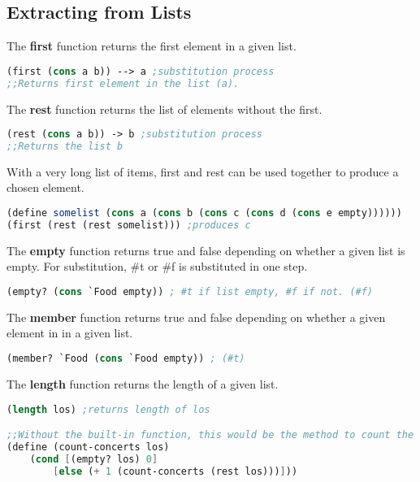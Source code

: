 \documentclass[english, 12pt]{article}
\begin{document}
\subsection{Extracting from Lists}
\begin{defn}
The \textbf{first} function returns the first element in a given list.
\begin{lstlisting}[language=Scheme]
(first (cons a b)) --> a ;substitution process
;;Returns first element in the list (a).
\end{lstlisting}
\end{defn}
\begin{defn}
The \textbf{rest} function returns the list of elements without the first. 
\begin{lstlisting}[language=Scheme]
(rest (cons a b)) -> b ;substitution process
;;Returns the list b 
\end{lstlisting}
\end{defn}
\begin{note}
With a very long list of items, first and rest can be used together to produce a chosen element.
\begin{lstlisting}[language=Scheme]
(define somelist (cons a (cons b (cons c (cons d (cons e empty))))))
(first (rest (rest somelist))) ;produces c
\end{lstlisting}
\end{note}
\begin{defn}
The \textbf{empty} function returns true and false depending on whether a given list is empty. For substitution, \#t or \#f is substituted in one step.
\begin{lstlisting}[language=Scheme]
(empty? (cons `Food empty)) ; #t if list empty, #f if not. (#f)
\end{lstlisting}
\end{defn}
\begin{defn}
The \textbf{member} function returns true and false depending on whether a given element in in a given list.
\begin{lstlisting}[language=Scheme]
(member? `Food (cons `Food empty)) ; (#t)
\end{lstlisting}
\end{defn}
\begin{defn}
The \textbf{length} function returns the length of a given list.
\begin{lstlisting}[language=Scheme]
(length los) ;returns length of los

;;Without the built-in function, this would be the method to count the length.
(define (count-concerts los)
	(cond [(empty? los) 0]
		[else (+ 1 (count-concerts (rest los)))]))
\end{lstlisting}
\end{defn}
\end{document}

